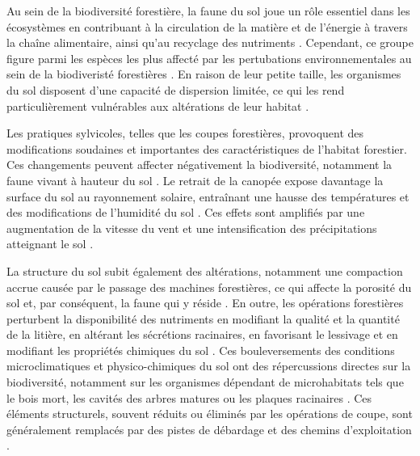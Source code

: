 Au sein de la biodiversité forestière, la faune du sol joue un rôle essentiel dans les écosystèmes en contribuant à la circulation de la matière et de l'énergie à travers la chaîne alimentaire, ainsi qu'au recyclage des nutriments \citep{Seibold2021contributioninsects,Kudrin2023metaanalysiseffects}.
Cependant, ce groupe figure parmi les espèces les plus affecté par les pertubations environnementales au sein de la biodiveristé forestières \citep{Marshall2000Impactsforest,Coyle2017Soilfauna}. 
En raison de leur petite taille, les organismes du sol disposent d'une capacité de dispersion limitée, ce qui les rend particulièrement vulnérables aux altérations de leur habitat \citep{Kudrin2023metaanalysiseffects}.

Les pratiques sylvicoles, telles que les coupes forestières, provoquent des modifications soudaines et importantes des caractéristiques de l'habitat forestier. 
Ces changements peuvent affecter négativement la biodiversité, notamment la faune vivant à hauteur du sol \citep{Lindo2003Microbialbiomass,Paillet2010Biodiversitydifferences,Fedrowitz2014Canretention,Chaudhary2016Impactforest}. 
Le retrait de la canopée expose davantage la surface du sol au rayonnement solaire, entraînant une hausse des températures et des modifications de l'humidité du sol \citep{Lindo2003Microbialbiomass,Brook2008Synergiesextinction,Zhang2022Intensiveforest}. 
Ces effets sont amplifiés par une augmentation de la vitesse du vent et une intensification des précipitations atteignant le sol \citep{Keenan1993ecologicaleffects,Heithecker2007Edgerelatedgradients}.

La structure du sol subit également des altérations, notamment une compaction accrue causée par le passage des machines forestières, ce qui affecte la porosité du sol et, par conséquent, la faune qui y réside \citep{Battigelli2004Shorttermimpact,Mazerolle2021Woodlandsalamander}. 
En outre, les opérations forestières perturbent la disponibilité des nutriments en modifiant la qualité et la quantité de la litière, en altérant les sécrétions racinaires, en favorisant le lessivage et en modifiant les propriétés chimiques du sol \citep{Covington1981Changesforest,Marshall2000Impactsforest,Lindo2003Microbialbiomass,Battigelli2004Shorttermimpact}. 
Ces bouleversements des conditions microclimatiques et physico-chimiques du sol ont des répercussions directes sur la biodiversité, 
notamment sur les organismes dépendant de microhabitats tels que le bois mort, les cavités des arbres matures ou les plaques racinaires \citep{Spies1999Dynamicforest,Christensen2005Deadwood,Brassard2008EffectsForest}. 
Ces éléments structurels, souvent réduits ou éliminés par les opérations de coupe, sont généralement remplacés par des pistes de débardage et des chemins d'exploitation \citep{Hansen1991ConservingBiodiversity}.


